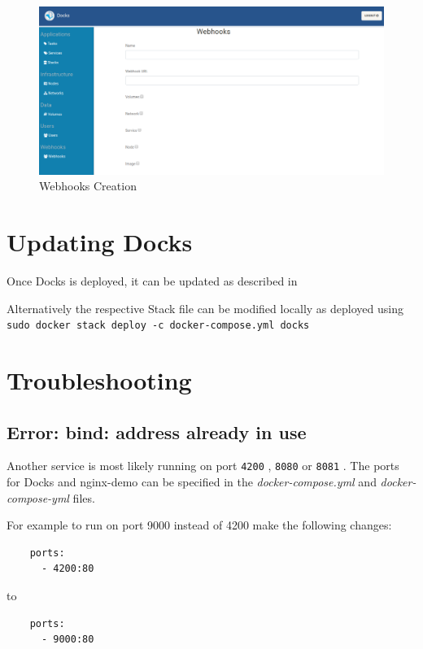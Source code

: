 \documentclass[]{article}
\let\oldtexttt\texttt
\renewcommand{\texttt}[1]{
	\colorbox{Light}{\oldtexttt{#1}}
}
\begin{document}
\begin{figure}[H]
	\centering
	\includegraphics[scale=0.4]{webhooks.png}
	\caption{Webhooks Creation}
\end{figure}

\section{Updating Docks}
Once Docks is deployed, it can be updated as described in 

Alternatively the respective Stack file can be modified locally as deployed using \\
\texttt{sudo docker stack deploy -c docker-compose.yml docks}

\section{Troubleshooting}
\subsection{Error: bind: address already in use}
Another service is most likely running on port \texttt{4200}, \texttt{8080} or \texttt{8081}.
The ports for Docks and nginx-demo can be specified in the \emph{docker-compose.yml} 
and \emph{docker-compose-yml} files.

For example to run on port 9000 instead of 4200 make the following changes:

\begin{lstlisting}
    ports:
      - 4200:80
\end{lstlisting}
to
\begin{lstlisting}
    ports:
      - 9000:80
\end{lstlisting}
\end{document}
